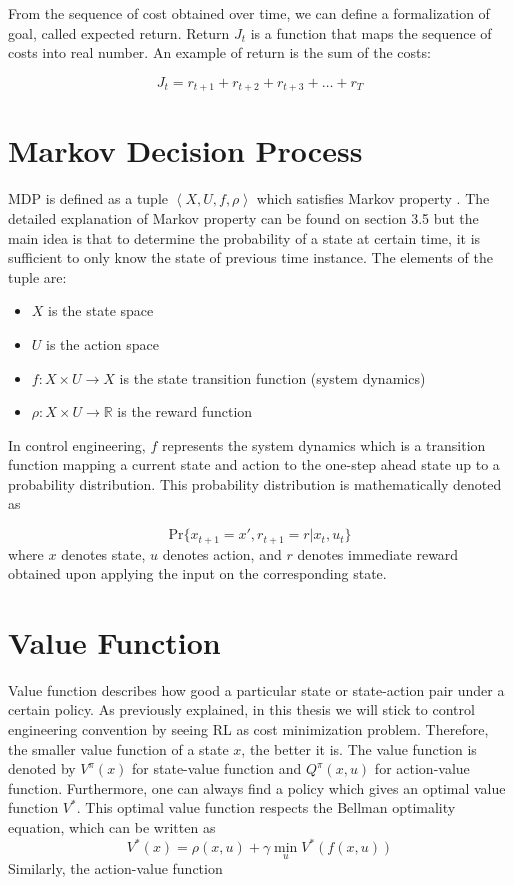 From the sequence of cost obtained over time, we can define a formalization of goal, called expected return. Return $J_t$ is a function that maps the sequence of costs into real number. An example of return is the sum of the costs:

\begin{equation}
J_t = r_{t+1} + r_{t+2} + r_{t+3} + \dots + r_T
\end{equation} 

\section{Markov Decision Process} \label{sec:mdp}
\ac{MDP} is defined as a tuple $\left<X, U, f, \rho \right>$ which satisfies Markov property \cite{babuskaRL}. The detailed explanation of Markov property can be found on \cite{sutton1998reinforcement} section 3.5 but the main idea is that to determine the probability of a state at certain time, it is sufficient to only know the state of previous time instance. The elements of the tuple are:
\begin{itemize}
	\item $X$ is the state space
	\item $U$ is the action space
	\item $f :X \times U \rightarrow X$ is the state transition function (system dynamics) 
	\item $\rho:X \times U \rightarrow \mathbb{R}$ is the reward function
\end{itemize}

In control engineering, $f$ represents the system dynamics which is a transition function mapping a current state and action to the one-step ahead state up to a probability distribution. This probability distribution is mathematically denoted as

\begin{equation}
	\text{Pr}\{x_{t+1} = x', r_{t+1} = r| x_t, u_t \}
	\label{eq:markov}
\end{equation}
where $x$ denotes state, $u$ denotes action, and $r$ denotes immediate reward obtained upon applying the input on the corresponding state. 



\section{Value Function} \label{sec:value}
Value function describes how good a particular state or state-action pair under a certain policy. As previously explained, in this thesis we will stick to control engineering convention by seeing \ac{RL} as cost minimization problem. Therefore, the smaller value function of a state $x$, the better it is. The value function is denoted by $ V^{\pi}(x) $ for state-value function and $ Q^{\pi}(x,u) $ for action-value function. Furthermore, one can always find a policy which gives an optimal value function $V^*$. This optimal value function respects the Bellman optimality equation, which can be written as 
\begin{equation}
V^*(x) = \rho(x,u) + \gamma \min_{u} V^*(f(x,u))
\label{eq:bellman}
\end{equation}
Similarly, the action-value function

